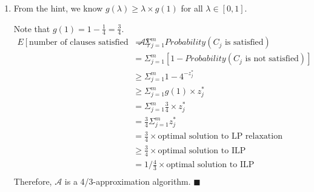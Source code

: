 \documentclass{article}
\begin{document}
\begin{enumerate}
\begin{enumerate}
        \item From the hint, we know $g(\lambda) \geq \lambda \times g(1)$ for all $\lambda \in [0, 1]$. 
        
        Note that $g(1)=1-\frac{1}{4}=\frac{3}{4}.$
        \begin{align*}
            E[\text{number of clauses satisfied using }\mathcal{A}] &= \Sigma_{j=1}^{m} Probability(C_j \text{ is satisfied})\\
            &= \Sigma_{j=1}^{m} [1 - Probability(C_j \text{ is not satisfied})]\\
            & \geq \Sigma_{j = 1}^{m} 1 - 4^{-z^*_j} \tag{from part (b)}\\
            &\geq \Sigma_{j=1}^{m}g(1) \times z^*_j \tag{from the hint}\\
            &= \Sigma_{j=1}^{m}\frac{3}{4} \times z^*_j\\
            &= \frac{3}{4} \Sigma_{j=1}^{m}z^*_j\\
            &= \frac{3}{4} \times \text{optimal solution to LP relaxation}\\
            & \geq \frac{3}{4} \times \text{optimal solution to ILP} \tag{because ILP has a smaller range of possible solutions}\\
            &= 1 / \frac{4}{3} \times \text{optimal solution to ILP}\\
            & \
        \end{align*}
        Therefore, $\mathcal{A}$ is a 4/3-approximation algorithm. \hfill $\blacksquare$
    \end{enumerate}
\end{enumerate}
\end{document}
